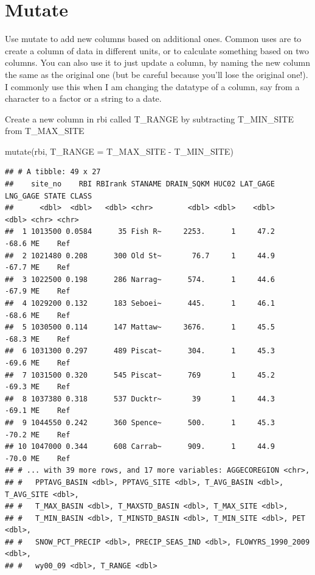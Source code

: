 \documentclass[
]{book}
\newenvironment{Shaded}{\begin{snugshade}}{\end{snugshade}}
\newcommand{\AttributeTok}[1]{\textcolor[rgb]{0.77,0.63,0.00}{#1}}
\newcommand{\FunctionTok}[1]{\textcolor[rgb]{0.00,0.00,0.00}{#1}}
\newcommand{\NormalTok}[1]{#1}
\newcommand{\SpecialCharTok}[1]{\textcolor[rgb]{0.00,0.00,0.00}{#1}}
\begin{document}
\hypertarget{mutate}{%
\section{Mutate}\label{mutate}}

Use mutate to add new columns based on additional ones. Common uses are to create a column of data in different units, or to calculate something based on two columns. You can also use it to just update a column, by naming the new column the same as the original one (but be careful because you'll lose the original one!). I commonly use this when I am changing the datatype of a column, say from a character to a factor or a string to a date.

Create a new column in rbi called T\_RANGE by subtracting T\_MIN\_SITE from T\_MAX\_SITE

\begin{Shaded}
\begin{Highlighting}[]
\FunctionTok{mutate}\NormalTok{(rbi, }\AttributeTok{T\_RANGE =}\NormalTok{ T\_MAX\_SITE }\SpecialCharTok{{-}}\NormalTok{ T\_MIN\_SITE)}
\end{Highlighting}
\end{Shaded}

\begin{verbatim}
## # A tibble: 49 x 27
##    site_no    RBI RBIrank STANAME DRAIN_SQKM HUC02 LAT_GAGE LNG_GAGE STATE CLASS
##      <dbl>  <dbl>   <dbl> <chr>        <dbl> <dbl>    <dbl>    <dbl> <chr> <chr>
##  1 1013500 0.0584      35 Fish R~     2253.      1     47.2    -68.6 ME    Ref  
##  2 1021480 0.208      300 Old St~       76.7     1     44.9    -67.7 ME    Ref  
##  3 1022500 0.198      286 Narrag~      574.      1     44.6    -67.9 ME    Ref  
##  4 1029200 0.132      183 Seboei~      445.      1     46.1    -68.6 ME    Ref  
##  5 1030500 0.114      147 Mattaw~     3676.      1     45.5    -68.3 ME    Ref  
##  6 1031300 0.297      489 Piscat~      304.      1     45.3    -69.6 ME    Ref  
##  7 1031500 0.320      545 Piscat~      769       1     45.2    -69.3 ME    Ref  
##  8 1037380 0.318      537 Ducktr~       39       1     44.3    -69.1 ME    Ref  
##  9 1044550 0.242      360 Spence~      500.      1     45.3    -70.2 ME    Ref  
## 10 1047000 0.344      608 Carrab~      909.      1     44.9    -70.0 ME    Ref  
## # ... with 39 more rows, and 17 more variables: AGGECOREGION <chr>,
## #   PPTAVG_BASIN <dbl>, PPTAVG_SITE <dbl>, T_AVG_BASIN <dbl>, T_AVG_SITE <dbl>,
## #   T_MAX_BASIN <dbl>, T_MAXSTD_BASIN <dbl>, T_MAX_SITE <dbl>,
## #   T_MIN_BASIN <dbl>, T_MINSTD_BASIN <dbl>, T_MIN_SITE <dbl>, PET <dbl>,
## #   SNOW_PCT_PRECIP <dbl>, PRECIP_SEAS_IND <dbl>, FLOWYRS_1990_2009 <dbl>,
## #   wy00_09 <dbl>, T_RANGE <dbl>
\end{verbatim}
\end{document}
